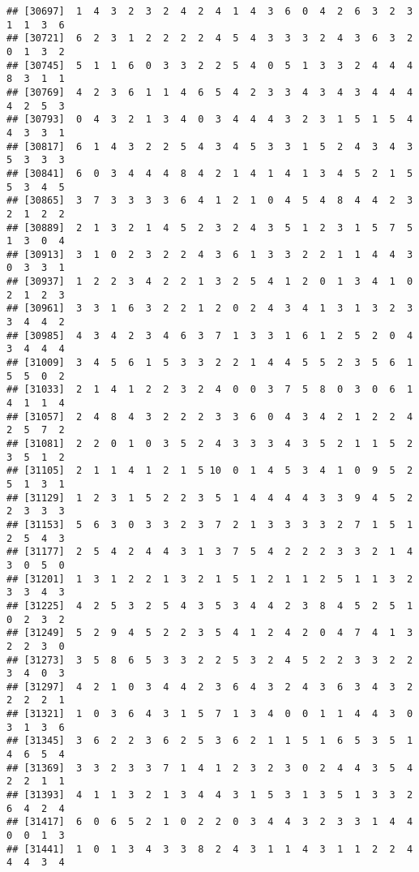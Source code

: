 \documentclass[
]{article}
\begin{document}
\begin{verbatim}
## [30697]  1  4  3  2  3  2  4  2  4  1  4  3  6  0  4  2  6  3  2  3  1  1  3  6
## [30721]  6  2  3  1  2  2  2  2  4  5  4  3  3  3  2  4  3  6  3  2  0  1  3  2
## [30745]  5  1  1  6  0  3  3  2  2  5  4  0  5  1  3  3  2  4  4  4  8  3  1  1
## [30769]  4  2  3  6  1  1  4  6  5  4  2  3  3  4  3  4  3  4  4  4  4  2  5  3
## [30793]  0  4  3  2  1  3  4  0  3  4  4  4  3  2  3  1  5  1  5  4  4  3  3  1
## [30817]  6  1  4  3  2  2  5  4  3  4  5  3  3  1  5  2  4  3  4  3  5  3  3  3
## [30841]  6  0  3  4  4  4  8  4  2  1  4  1  4  1  3  4  5  2  1  5  5  3  4  5
## [30865]  3  7  3  3  3  3  6  4  1  2  1  0  4  5  4  8  4  4  2  3  2  1  2  2
## [30889]  2  1  3  2  1  4  5  2  3  2  4  3  5  1  2  3  1  5  7  5  1  3  0  4
## [30913]  3  1  0  2  3  2  2  4  3  6  1  3  3  2  2  1  1  4  4  3  0  3  3  1
## [30937]  1  2  2  3  4  2  2  1  3  2  5  4  1  2  0  1  3  4  1  0  2  1  2  3
## [30961]  3  3  1  6  3  2  2  1  2  0  2  4  3  4  1  3  1  3  2  3  3  4  4  2
## [30985]  4  3  4  2  3  4  6  3  7  1  3  3  1  6  1  2  5  2  0  4  3  4  4  4
## [31009]  3  4  5  6  1  5  3  3  2  2  1  4  4  5  5  2  3  5  6  1  5  5  0  2
## [31033]  2  1  4  1  2  2  3  2  4  0  0  3  7  5  8  0  3  0  6  1  4  1  1  4
## [31057]  2  4  8  4  3  2  2  2  3  3  6  0  4  3  4  2  1  2  2  4  2  5  7  2
## [31081]  2  2  0  1  0  3  5  2  4  3  3  3  4  3  5  2  1  1  5  2  3  5  1  2
## [31105]  2  1  1  4  1  2  1  5 10  0  1  4  5  3  4  1  0  9  5  2  5  1  3  1
## [31129]  1  2  3  1  5  2  2  3  5  1  4  4  4  4  3  3  9  4  5  2  2  3  3  3
## [31153]  5  6  3  0  3  3  2  3  7  2  1  3  3  3  3  2  7  1  5  1  2  5  4  3
## [31177]  2  5  4  2  4  4  3  1  3  7  5  4  2  2  2  3  3  2  1  4  3  0  5  0
## [31201]  1  3  1  2  2  1  3  2  1  5  1  2  1  1  2  5  1  1  3  2  3  3  4  3
## [31225]  4  2  5  3  2  5  4  3  5  3  4  4  2  3  8  4  5  2  5  1  0  2  3  2
## [31249]  5  2  9  4  5  2  2  3  5  4  1  2  4  2  0  4  7  4  1  3  2  2  3  0
## [31273]  3  5  8  6  5  3  3  2  2  5  3  2  4  5  2  2  3  3  2  2  3  4  0  3
## [31297]  4  2  1  0  3  4  4  2  3  6  4  3  2  4  3  6  3  4  3  2  2  2  2  1
## [31321]  1  0  3  6  4  3  1  5  7  1  3  4  0  0  1  1  4  4  3  0  3  1  3  6
## [31345]  3  6  2  2  3  6  2  5  3  6  2  1  1  5  1  6  5  3  5  1  4  6  5  4
## [31369]  3  3  2  3  3  7  1  4  1  2  3  2  3  0  2  4  4  3  5  4  2  2  1  1
## [31393]  4  1  1  3  2  1  3  4  4  3  1  5  3  1  3  5  1  3  3  2  6  4  2  4
## [31417]  6  0  6  5  2  1  0  2  2  0  3  4  4  3  2  3  3  1  4  4  0  0  1  3
## [31441]  1  0  1  3  4  3  3  8  2  4  3  1  1  4  3  1  1  2  2  4  4  4  3  4

\end{verbatim}
\end{document}
